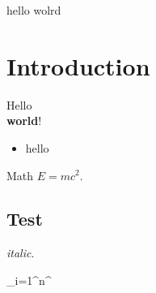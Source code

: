 \documentclass{article} %
\begin{document}
hello wolrd
\section{Introduction} %
Hello \\ %
\textbf{world}! %

\begin{itemize}
	\item hello
\end{itemize}

Math $E=mc^2$. %

\subsection{Test}
\textit{italic}.

\sum_{i=1}^{n}^{\infty}
\end{document}
